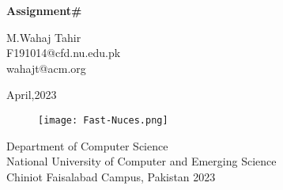 \begin{Titlepage}
\begin{center}
    \vspace*{2cm}
    
    \textbf{\Huge Assignment\#}\\
    \vspace*{2cm}
    
      
      \vspace{0.2cm}
      \begin{center}
          \large M.Wahaj Tahir\\F191014@cfd.nu.edu.pk\\wahajt@acm.org
      \end{center} 
    
    \vspace{1.5cm}
    \begin{center}
    \large April,2023 
    \end{center}
    
    \vfill
    \vspace{0.8cm}
    \begin{figure}[hb]
        \centering
        \texttt{[image: Fast-Nuces.png]}
    \end{figure}
    Department of Computer Science\\ National University of Computer and Emerging Science\\ Chiniot Faisalabad Campus, Pakistan 2023
    \end{center}
\end{Titlepage}








